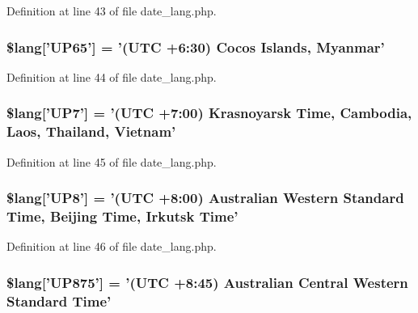 Definition at line 43 of file date\-\_\-lang.\-php.

\hypertarget{date__lang_8php_af94f885b6e6c50abdf7672ddfa80774d}{
\subsubsection[{\$lang}]{\setlength{\rightskip}{0pt plus 5cm}\$lang\mbox{[}'U\-P65'\mbox{]} = '(U\-T\-C +6\-:30) Cocos Islands, Myanmar'}}\label{date__lang_8php_af94f885b6e6c50abdf7672ddfa80774d}


Definition at line 44 of file date\-\_\-lang.\-php.

\hypertarget{date__lang_8php_aeedffaf1d3a16a41e881d85c420482ce}{
\subsubsection[{\$lang}]{\setlength{\rightskip}{0pt plus 5cm}\$lang\mbox{[}'U\-P7'\mbox{]} = '(U\-T\-C +7\-:00) Krasnoyarsk Time, Cambodia, Laos, Thailand, Vietnam'}}\label{date__lang_8php_aeedffaf1d3a16a41e881d85c420482ce}


Definition at line 45 of file date\-\_\-lang.\-php.

\hypertarget{date__lang_8php_a2a828a680158ca4cfb7fba60f35c67a3}{
\subsubsection[{\$lang}]{\setlength{\rightskip}{0pt plus 5cm}\$lang\mbox{[}'U\-P8'\mbox{]} = '(U\-T\-C +8\-:00) Australian Western Standard Time, Beijing Time, Irkutsk Time'}}\label{date__lang_8php_a2a828a680158ca4cfb7fba60f35c67a3}


Definition at line 46 of file date\-\_\-lang.\-php.

\hypertarget{date__lang_8php_a486696d3d41c5d263a8b550903052ecb}{
\subsubsection[{\$lang}]{\setlength{\rightskip}{0pt plus 5cm}\$lang\mbox{[}'U\-P875'\mbox{]} = '(U\-T\-C +8\-:45) Australian Central Western Standard Time'}}\label{date__lang_8php_a486696d3d41c5d263a8b550903052ecb}


